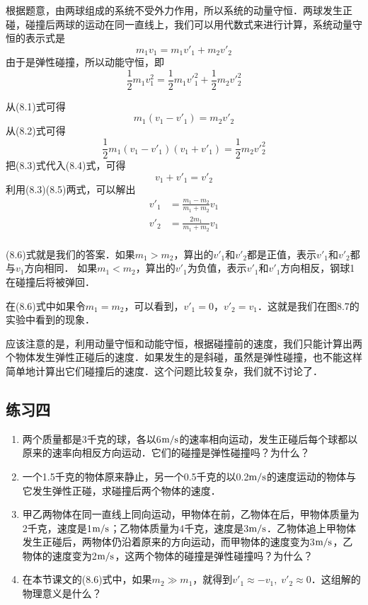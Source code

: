 \begin{solution}
    根据题意，由两球组成的系统不受外力作用，所以系统的动量守恒．两球发生正碰，碰撞后两球的运动在同一直线上，我们可以用代数式来进行计算，系统动量守恒的表示式是
\begin{equation}
    m_1v_1=m_1v'_1+m_2v'_2
\end{equation}
由于是弹性碰撞，所以动能守恒，即
\begin{equation}
    \frac{1}{2}m_1v_1^2=\frac{1}{2}m_1{v'}_1^2+\frac{1}{2}m_2{v'}_2^2
\end{equation}

从(8.1)式可得
\begin{equation}
    m_1(v_1-v'_1)=m_2v'_2
\end{equation}
从(8.2)式可得
\begin{equation}
    \frac{1}{2}m_1(v_1-v'_1)(v_1+v'_1)=\frac{1}{2}m_2{v'}_2^2
\end{equation}
把(8.3)式代入(8.4)式，可得
\begin{equation}
 v_1+v'_1=v'_2   
\end{equation}
利用(8.3)(8.5)两式，可以解出
\begin{equation}
\begin{split}
    v'_1&=\frac{m_1-m_2}{m_1+m_2}v_1\\
    v'_2&=\frac{2m_1}{m_1+m_2}v_1\\
\end{split}
\end{equation}
\end{solution}

(8.6)式就是我们的答案．如果$m_1>m_2$，算出的$v'_1$和$v'_2$都是正值，表示$v'_1$和$v'_2$都与$v_1$方向相同．
如果$m_1<m_2$，算出的$v'_1$为负值，表示$v'_1$和$v'_1$方向相反，钢球1在碰撞后将被弹回．

在(8.6)式中如果令$m_1=m_2$，可以看到，$v'_1=0$，$v'_2=v_1$．这就是我们在图8.7的实验中看到的现象．

应该注意的是，利用动量守恒和动能守恒，根据碰撞前的速度，我们只能计算出两个物体发生弹性正碰后的速度．如果发生的是斜碰，虽然是弹性碰撞，也不能这样简单地计算出它们碰撞后的速度．这个问题比较复杂，我们就不讨论了．

\subsection*{练习四}
\begin{enumerate}
\item 两个质量都是3千克的球，各以6$\text{m}/\text{s}$的速率相向运动，发生正碰后每个球都以原来的速率向相反方向运动．它们的碰撞是弹性碰撞吗？为什么？
\item 一个1.5千克的物体原来静止，另一个0.5千克的以0.2$\text{m}/\text{s}$的速度运动的物体与它发生弹性正碰，求碰撞后两个物体的速度．
\item 甲乙两物体在同一直线上同向运动，甲物体在前，乙物体在后，甲物体质量为2千克，速度是1$\text{m}/\text{s}$；乙物体质量为4千克，速度是3$\text{m}/\text{s}$．乙物体追上甲物体发生正碰后，两物体仍沿着原来的方向运动，而甲物体的速度变为3$\text{m}/\text{s}$，乙物体的速度变为2$\text{m}/\text{s}$，这两个物体的碰撞是弹性碰撞吗？为什么？
\item 在本节课文的(8.6)式中，如果$m_2\gg m_1$，就得到$v'_1\approx -v_1,\; v'_2\approx 0$．这组解的物理意义是什么？
\end{enumerate}


